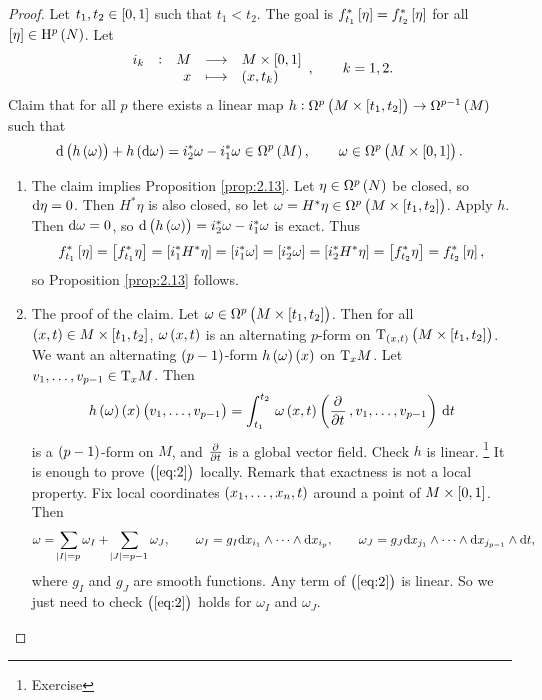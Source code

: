 \begin{proof}
Let $ t_1, t_2 \in \sbr{0, 1} $ such that $ t_1 < t_2 $. The goal is $ f_{t_1}^*\sbr{\eta} = f_{t_2}^*\sbr{\eta} $ for all $ \sbr{\eta} \in \H^p\br{N} $. Let
$$ \function[i_k]{M}{M \times \sbr{0, 1}}{x}{\br{x, t_k}}, \qquad k = 1, 2. $$
Claim that for all $ p $ there exists a linear map $ h : \Omega^p\br{M \times \sbr{t_1, t_2}} \to \Omega^{p - 1}\br{M} $ such that
\begin{equation}
\label{eq:2}
\d\br{h\br{\omega}} + h\br{\d\omega} = i_2^*\omega - i_1^*\omega \in \Omega^p\br{M}, \qquad \omega \in \Omega^p\br{M \times \sbr{0, 1}}.
\end{equation}
\begin{enumerate}[leftmargin=0.5in, label=Step \arabic*.]
\item The claim implies Proposition \ref{prop:2.13}. Let $ \eta \in \Omega^p\br{N} $ be closed, so $ \mathrm{d}\eta = 0 $. Then $ H^*\eta $ is also closed, so let $ \omega = H^*\eta \in \Omega^p\br{M \times \sbr{t_1, t_2}} $. Apply $ h $. Then $ \mathrm{d}\omega = 0 $, so $ \d\br{h\br{\omega}} = i_2^*\omega - i_1^*\omega $ is exact. Thus
$$ f_{t_1}^*\sbr{\eta} = \sbr{f_{t_1}^*\eta} = \sbr{i_1^*H^*\eta} = \sbr{i_1^*\omega} = \sbr{i_2^*\omega} = \sbr{i_2^*H^*\eta} = \sbr{f_{t_2}^*\eta} = f_{t_2}^*\sbr{\eta}, $$
so Proposition \ref{prop:2.13} follows.


\item The proof of the claim. Let $ \omega \in \Omega^p\br{M \times \sbr{t_1, t_2}} $. Then for all $ \br{x, t} \in M \times \sbr{t_1, t_2} $, $ \omega\br{x, t} $ is an alternating $ p $-form on $ \T_{\br{x, t}}\br{M \times \sbr{t_1, t_2}} $. We want an alternating $ \br{p - 1} $-form $ h\br{\omega}\br{x} $ on $ \mathrm{T}_xM $. Let $ v_1, \dots, v_{p - 1} \in \mathrm{T}_xM $. Then
$$ h\br{\omega}\br{x}\br{v_1, \dots, v_{p - 1}} = \intd{t_1}{t_2}{\omega\br{x, t}\br{\dpd{}{t}, v_1, \dots, v_{p - 1}}}{t} $$
is a $ \br{p - 1} $-form on $ M $, and $ \tpd{}{t} $ is a global vector field. Check $ h $ is linear. \footnote{Exercise} It is enough to prove $ \br{\ref{eq:2}} $ locally. Remark that exactness is not a local property. Fix local coordinates $ \br{x_1, \dots, x_n, t} $ around a point of $ M \times \sbr{0, 1} $. Then
$$ \omega = \sum_{\abs{I} = p} \omega_I + \sum_{\abs{J} = p - 1} \omega_J, \qquad \omega_I = g_I\mathrm{d} x_{i_1} \wedge \dots \wedge \mathrm{d} x_{i_p}, \qquad \omega_J = g_J\mathrm{d} x_{j_1} \wedge \dots \wedge \mathrm{d} x_{j_{p - 1}} \wedge \mathrm{d} t, $$
where $ g_I $ and $ g_J $ are smooth functions. Any term of $ \br{\ref{eq:2}} $ is linear. So we just need to check $ \br{\ref{eq:2}} $ holds for $ \omega_I $ and $ \omega_J $.


\end{enumerate}
\end{proof}
